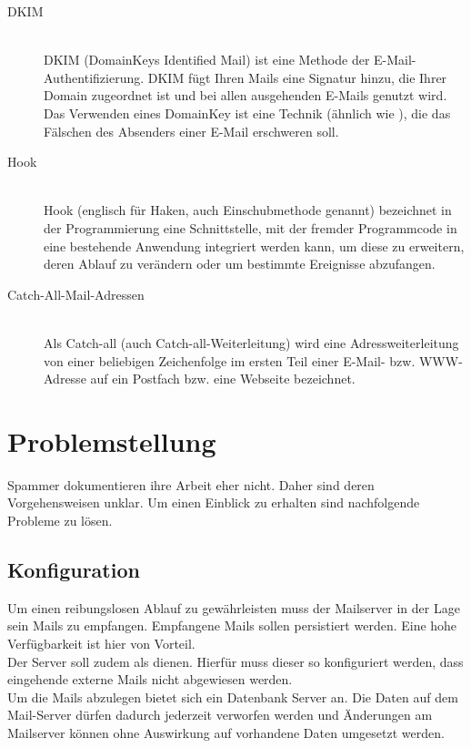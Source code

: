 \documentclass[a4paper,11pt,singlespacing]{article}
\begin{document}
\begin{description}
	\item[DKIM\label{itm:DKIM}]\hfill \\
		DKIM (DomainKeys Identified Mail) ist eine Methode der E-Mail-Authentifizierung. DKIM fügt Ihren Mails eine Signatur hinzu, die Ihrer Domain zugeordnet ist und bei allen ausgehenden E-Mails genutzt wird. Das Verwenden eines DomainKey ist eine Technik (ähnlich wie  ), die das Fälschen des Absenders einer E-Mail erschweren soll.\cite{DKIM}
	\item[Hook\label{itm:Hook}]\hfill \\
		Hook (englisch für Haken, auch Einschubmethode genannt) bezeichnet in der Programmierung eine Schnittstelle, mit der fremder Programmcode in eine bestehende Anwendung integriert werden kann, um diese zu erweitern, deren Ablauf zu verändern oder um bestimmte Ereignisse abzufangen.\cite{Hook}
	\item[Catch-All-Mail-Adressen\label{itm:Catch-All-Mail}]\hfill \\
		Als Catch-all (auch Catch-all-Weiterleitung) wird eine Adressweiterleitung von einer beliebigen Zeichenfolge im ersten Teil einer E-Mail- bzw. WWW-Adresse auf ein Postfach bzw. eine Webseite bezeichnet.\cite{Catch-All-Mail}
	\end{description}

\newpage

\section{Problemstellung}\label{sec:Problemstellung}
	Spammer dokumentieren ihre Arbeit eher nicht.
	Daher sind deren Vorgehensweisen unklar.
	Um einen Einblick zu erhalten sind nachfolgende Probleme zu lösen.

	\subsection{Konfiguration}\label{sec:ProblemstellungKonfiguration}
		Um einen reibungslosen Ablauf zu gewährleisten muss der Mailserver in der Lage sein Mails zu empfangen.
		Empfangene Mails sollen persistiert werden.
		Eine hohe Verfügbarkeit ist hier von Vorteil.
		\\
		Der Server soll zudem als  dienen.
		Hierfür muss dieser so konfiguriert werden, dass eingehende externe Mails nicht abgewiesen werden.
		\\
		Um die Mails abzulegen bietet sich ein Datenbank Server an.
		Die Daten auf dem Mail-Server dürfen dadurch jederzeit verworfen werden und Änderungen am Mailserver können ohne Auswirkung auf vorhandene Daten umgesetzt werden.
\end{document}
